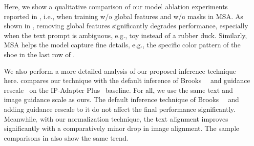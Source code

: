 Here, we show a qualitative comparison of our model ablation experiments reported in , i.e., when training w/o global features and w/o masks in MSA.  As shown in , removing global features significantly degrades performance, especially when the text prompt is ambiguous, e.g., toy instead of a rubber duck. Similarly, MSA helps the model capture fine details, e.g., the specific color pattern of the shoe in the last row of . 


\noindent We also perform a more detailed analysis of our proposed inference technique here.  compares our technique with the default inference of Brooks~\etal ~\cite{brooks2023instructpix2pix} and guidance rescale~\cite{lin2024common} on the IP-Adapter Plus~\cite{ye2023ip} baseline. For all, we use the same text and image guidance scale as ours. The default inference technique of Brooks~\etal ~\cite{brooks2023instructpix2pix} and adding guidance rescale to it do not affect the final performance significantly. Meanwhile, with our normalization technique, the text alignment improves significantly with a comparatively minor drop in image alignment. The sample comparisons in  also show the same trend. 


\begin{table}[!t]
\centering
\setlength{\tabcolsep}{5pt}
\vspace{-8pt}
\caption{ \textbf{Results on CustomConcept101~\cite{kumari2023multi}}. Our method outperforms both Emu-2~\cite{Emu2} and IP-Adapter~\cite{ye2023ip} on the overall Geometric Score~\cite{yan2023motion} metric while being on par regarding image alignment. The Geometric Score is computed by taking the geometric mean of MDINOv2-I and TIFA scores, both of which are in the 0-1 range.  
}

\label{tbl:customconcept101}
\end{table}

